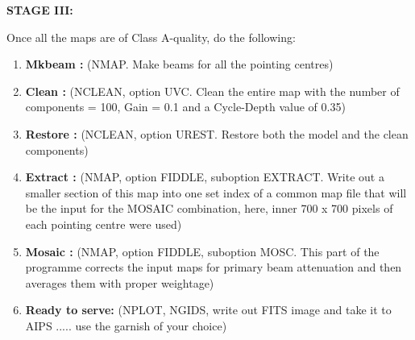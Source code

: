 {\bf STAGE III:}

Once all the maps are of Class A-quality, do the following:

\begin{enumerate}
\item {\bf Mkbeam :} (NMAP. Make beams for all the pointing centres)
\item {\bf Clean :} (NCLEAN, option UVC. Clean the entire map with the number
of components = 100, Gain = 0.1 and a Cycle-Depth value of 0.35)
\item {\bf Restore :} (NCLEAN, option UREST. Restore both the model and the
clean components)
\item {\bf Extract :} (NMAP, option FIDDLE, suboption EXTRACT. Write out a
smaller section of this map into one set index of a common map file that will
be the input for the MOSAIC combination, here, inner 700 x 700 pixels of each
pointing centre were used)
\item {\bf Mosaic :} (NMAP, option FIDDLE, suboption MOSC. This part of the
programme corrects the input maps for primary beam attenuation and then
averages them with proper weightage)
\item {\bf Ready to serve:} (NPLOT, NGIDS, write out FITS image and take it to
AIPS ..... use the garnish of your choice)
\end{enumerate}



